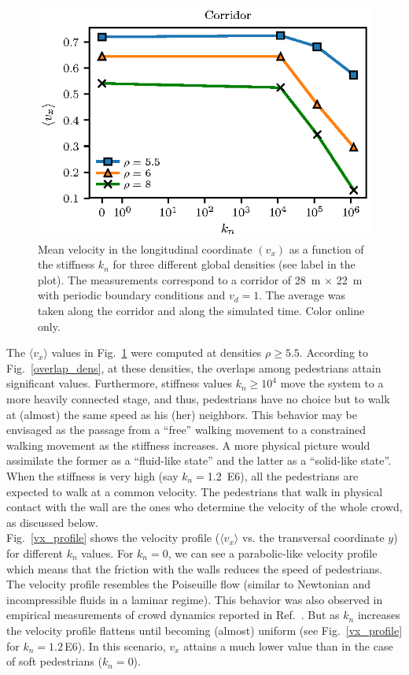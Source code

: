 \documentclass[preprint,12pt]{elsarticle}
\begin{document}
\begin{figure}[htbp!]
\centering
\includegraphics[width=0.7\columnwidth]{./kn_vs_vx_corridor.eps}
\caption{\label{kn_vs_vx_corridor} Mean velocity in the longitudinal coordinate
$(v_x)$ as a function of the stiffness $k_n$ for three different global 
densities (see label in the plot). The measurements correspond to a corridor of 
28~m $\times$ 22~m with periodic boundary conditions and $v_d=1$. The average 
was taken along the corridor and along the simulated time. Color online only.}
\end{figure}

The $\langle v_x\rangle$ values in Fig.~\ref{kn_vs_vx_corridor}  were computed
at densities $\rho\geq 5.5$. According to  Fig.~\ref{overlap_dens}, at these
densities, the overlaps among pedestrians attain significant values.
Furthermore,  stiffness values $k_n\geq 10^4$ move the system to a more heavily
connected  stage, and thus, pedestrians have no choice but to walk at  (almost)
the same speed as his (her) neighbors. This  behavior may be envisaged as the
passage from a ``free''  walking movement to a constrained walking movement as
the stiffness increases. A more  physical picture would assimilate the former as
a ``fluid-like  state'' and the latter as a ``solid-like state''. When the
stiffness is  very high (say $k_n=$1.2~E6), all the pedestrians  are expected to
walk at a common velocity. The  pedestrians that walk in physical contact with
the wall are the ones who  determine the velocity of the whole crowd, as
discussed  below.\\

Fig.~\ref{vx_profile} shows the velocity profile ($\langle v_x \rangle$ vs. the
transversal coordinate $y$) for different $k_n$ values. For $k_n=0$, we can see
a parabolic-like velocity profile which means that the friction with the walls
reduces the speed of pedestrians. The velocity profile resembles the Poiseuille
flow (similar to Newtonian and incompressible fluids in a laminar regime). This
behavior was also observed in empirical measurements of crowd dynamics reported
in Ref.~\cite{zhang2013empirical}. But as $k_n$ increases the velocity profile
flattens until becoming (almost) uniform (see Fig.~\ref{vx_profile} for
$k_n=1.2\,$E6). In this scenario, $v_x$ attains a much lower  value  than in the
case of soft pedestrians ($k_n=$0).\\
\end{document}
